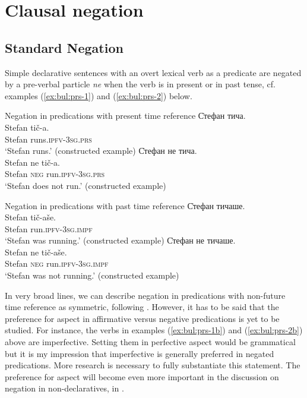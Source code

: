 \documentclass[output=paper,colorlinks=true, citecolor=brown]{langscibook}
\begin{document}

\section{Clausal negation}
\subsection{Standard Negation} \label{sec:bul:sn}
Simple declarative sentences with an overt lexical verb as a predicate are negated by a pre-verbal particle \textit{ne} when the verb is in present or in past tense, cf. examples (\ref{ex:bul:prs-1}) and (\ref{ex:bul:prs-2}) below.
 
\ea Negation in predications with present time reference \label{ex:bul:prs-1}
  \ea С̇тефан тича.\label{ex:bul:prs-1a} \\ 
  	\gll Stefan tič-a. \\
     Stefan runs.\textsc{ipfv}-\textsc{3sg}.\textsc{prs}\\
    \glt `Stefan runs.' (constructed example)
  \ex С̇тефан не тича.\label{ex:bul:prs-1b}\\
  	\gll Stefan ne  tič-a.\\
  	Stefan \textsc{neg}    run.\textsc{ipfv}-\textsc{3sg}.\textsc{prs} \\
    \glt `Stefan does not run.' (constructed example)
  \z 
\z

\ea Negation in predications with past time reference\label{ex:bul:prs-2}
  \ea С̇тефан тичаше.\label{ex:bul:prs-2a} \\ 
  	\gll Stefan tič-aše. \\
     Stefan run.\textsc{ipfv}-\textsc{3sg}.\textsc{impf}\\
    \glt `Stefan was running.' (constructed example)
  \ex С̇тефан не тичаше.\label{ex:bul:prs-2b}\\
  	\gll Stefan ne  tič-aše.\\
  	Stefan \textsc{neg}    run.\textsc{ipfv}-\textsc{3sg}.\textsc{impf} \\
    \glt `Stefan was not running.' (constructed example)
  \z 
\z

In very broad lines, we can describe negation in predications with non-future time reference as symmetric, following \citet{Miestamo2005}. However, it has to be said that the preference for aspect in affirmative versus negative predications is yet to be studied. For instance, the verbs in examples (\ref{ex:bul:prs-1b}) and (\ref{ex:bul:prs-2b}) above are imperfective. Setting them in perfective aspect would be grammatical but it is my impression that imperfective is generally preferred in negated predications. More research is necessary to fully substantiate this statement. The preference for aspect will become even more important in the discussion on negation in non-declaratives, in .
\end{document}
